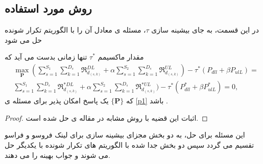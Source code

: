 \subsection{روش مورد استفاده}
در این قسمت، به جای بیشینه سازی $\tau$، مسئله ی معادل آن را با الگوریتم تکرار شونده حل می شود
\begin{theorem}\label{t2}
مقدار ماکسیمم $\tau^*$  تنها زمانی بدست می آید که
\begin{equation}\label{q2}
\begin{split}
&\max \limits_{\boldsymbol{P}} (\sum\limits_{s=1}^{S_1} \sum\limits_{k=1}^{{D}_s}\mathfrak{R}_{d_{(s,k)}}^{DL} + \alpha \sum\limits_{s=1}^{S_2} \sum\limits_{k=1}^{{D}_s}\mathfrak{R}_{d_{(s,k)}}^{UL}) - \tau^*(P_{dll}+ \beta P_{ulL} )=\\
& \sum\limits_{s=1}^{S_1} \sum\limits_{k=1}^{{D}_s}\mathfrak{R}_{d_{(s,k)}}^{*DL} + \alpha \sum\limits_{s=1}^{S_2} \sum\limits_{k=1}^{{D}_s}\mathfrak{R}_{d_{(s,k)}}^{*UL}) - \tau^*(P_{dll}^{*}+ \beta P_{ulL}^{*} )=0,
\end{split}
\end{equation}
که $\{\boldsymbol{P}\}$  یک پاسخ امکان پذیر برای مسئله ی \eqref{p1} باشد 
\cite{hcranEE}.
\end{theorem}
\begin{proof}
اثبات این قضیه با روش مشابه در مقاله ی \cite{hcranEE} حل شده است.
\end{proof}
این مسئله برای حل، به دو بخش مجزای بیشینه سازی برای لینک فروسو و فراسو تقسیم می گردد سپس دو بخش جدا شده با الگوریتم های تکرار شونده با یکدیگر حل می شوند و جواب بهینه را می دهند.
